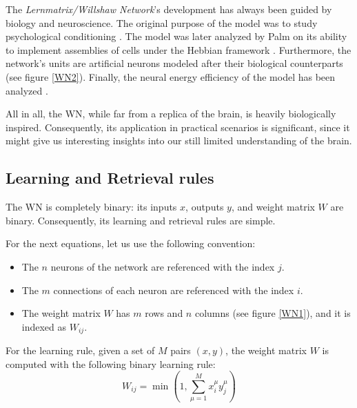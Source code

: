 \documentclass{article}
\begin{document}
The \textit{Lernmatrix/Willshaw Network}'s development has always been guided by biology and neuroscience. The original purpose of the model was to study psychological conditioning \cite{steinbuch1961lernmatrix, steinbuch1965automat}.
The model was later analyzed by Palm \cite{palm1982neural} on its ability to implement assemblies of cells under the Hebbian framework \cite{hebb2005organization}.
Furthermore, the network's units are artificial neurons \cite{mcculloch1943logical} modeled after their biological counterparts (see figure \ref{WN2}). Finally, the neural energy efficiency of the model has been analyzed \cite{laughlin2003communication, lennie2003cost}.

All in all, the WN, while far from a replica of the brain, is heavily biologically inspired. Consequently, its application in practical scenarios is significant, since it might give us interesting insights into our still limited understanding of the brain. 

\newpage
\subsection{Learning and Retrieval rules}
The WN is completely binary: its inputs $x$, outputs $y$, and weight matrix $W$ are binary. Consequently, its learning and retrieval rules are simple.
\newline

For the next equations, let us use the following convention:
\begin{itemize}
    \item The $n$ neurons of the network are referenced with the index $j$.
    \item The $m$ connections of each neuron are referenced with the index $i$.
    \item The weight matrix $W$ has $m$ rows and $n$ columns (see figure \ref{WN1}), and it is indexed as $W_{ij}$.
\end{itemize}

For the learning rule, given a set of $M$ pairs $(x,y)$, the weight matrix $W$ is computed with the following binary learning rule: 
\begin{equation}
W_{i j}=\min \left(1, \sum_{\mu=1}^{M} x_{i}^{\mu} y_{j}^{\mu}\right)
\label{eqn:wn_lrn}
\end{equation}
\newline
\end{document}
